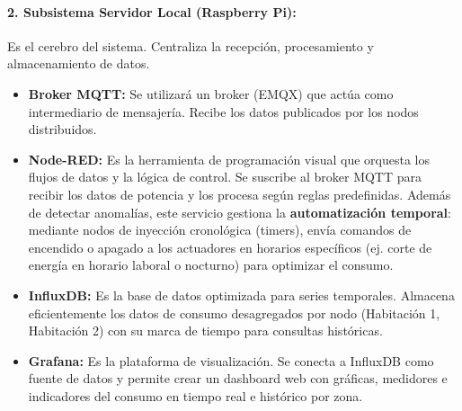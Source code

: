         \paragraph{2. Subsistema Servidor Local (Raspberry Pi):}
        Es el cerebro del sistema.
        Centraliza la recepción, procesamiento y almacenamiento de datos.
        \begin{itemize}
            \item \textbf{Broker MQTT:} Se utilizará un broker (EMQX) que actúa como intermediario de mensajería.
            Recibe los datos publicados por los nodos distribuidos.
            \item \textbf{Node-RED:} Es la herramienta de programación visual que orquesta los flujos de datos y la lógica de control. Se suscribe al broker MQTT para recibir los datos de potencia y los procesa según reglas predefinidas. Además de detectar anomalías, este servicio gestiona la \textbf{automatización temporal}: mediante nodos de inyección cronológica (timers), envía comandos de encendido o apagado a los actuadores en horarios específicos (ej. corte de energía en horario laboral o nocturno) para optimizar el consumo.
            \item \textbf{InfluxDB:} Es la base de datos optimizada para series temporales.
            Almacena eficientemente los datos de consumo desagregados por nodo (Habitación 1, Habitación 2) con su marca de tiempo para consultas históricas.
            \item \textbf{Grafana:} Es la plataforma de visualización. Se conecta a InfluxDB como fuente de datos y permite crear un dashboard web con gráficas, medidores e indicadores del consumo en tiempo real e histórico por zona.
        \end{itemize}

